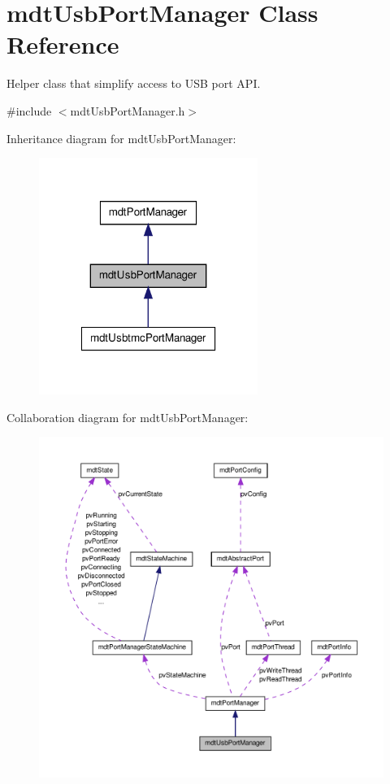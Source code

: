 \hypertarget{classmdt_usb_port_manager}{
\section{mdtUsbPortManager Class Reference}
\label{classmdt_usb_port_manager}
}


Helper class that simplify access to USB port API.  




{\ttfamily \#include $<$mdtUsbPortManager.h$>$}



Inheritance diagram for mdtUsbPortManager:\nopagebreak
\begin{figure}[H]
\begin{center}
\leavevmode
\includegraphics[width=202pt]{classmdt_usb_port_manager__inherit__graph}
\end{center}
\end{figure}


Collaboration diagram for mdtUsbPortManager:\nopagebreak
\begin{figure}[H]
\begin{center}
\leavevmode
\includegraphics[width=400pt]{classmdt_usb_port_manager__coll__graph}
\end{center}
\end{figure}
